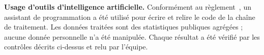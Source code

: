 \documentclass{article}
\begin{document}
\textbf{Usage d'outils d'intelligence artificielle.} Conformément au règlement~\cite{dcb_document}, un assistant de programmation a été utilisé pour écrire et relire le code de la chaîne de traitement. Les données traitées sont des statistiques publiques agrégées ; aucune donnée personnelle n'a été manipulée. Chaque résultat a été vérifié par les contrôles décrits ci-dessus et relu par l'équipe.



\end{document}
